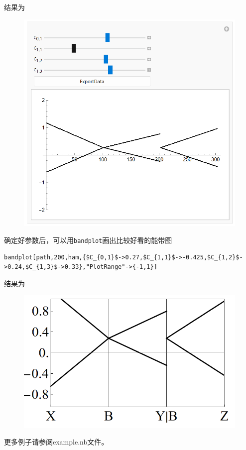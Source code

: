 \documentclass[titlepage,a4paper,12pt,AutoFakeBold]{article}
\begin{document}
结果为
\begin{figure}[H]
	\centering
	\includegraphics[width=.5\textwidth]{./figures/bandm}
\end{figure}
确定好参数后，可以用\lstinline|bandplot|画出比较好看的能带图
\begin{lstlisting}[backgroundcolor={\color{yellow!5!white}},mathescape=true]
bandplot[path,200,ham,{$C_{0,1}$->0.27,$C_{1,1}$->-0.425,$C_{1,2}$->0.24,$C_{1,3}$->0.33},"PlotRange"->{-1,1}]
\end{lstlisting}
结果为
\begin{figure}[H]
	\centering
	\includegraphics[width=.5\textwidth]{./figures/band}
\end{figure}
更多例子请参阅example.nb文件。
\end{document}
